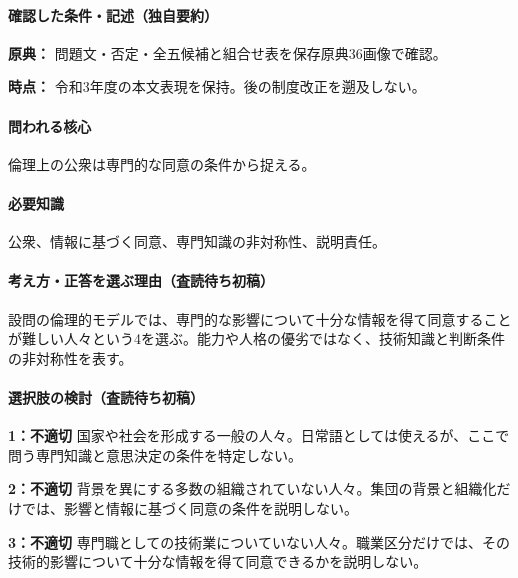 \paragraph{確認した条件・記述（独自要約）}\mbox{}\par

\noindent\textbf{原典：} 問題文・否定・全五候補と組合せ表を保存原典36画像で確認。\par

\noindent\textbf{時点：} 令和3年度の本文表現を保持。後の制度改正を遡及しない。\par

\paragraph{問われる核心} 倫理上の公衆は専門的な同意の条件から捉える。

\paragraph{必要知識} 公衆、情報に基づく同意、専門知識の非対称性、説明責任。

\paragraph{考え方・正答を選ぶ理由（査読待ち初稿）} 設問の倫理的モデルでは、専門的な影響について十分な情報を得て同意することが難しい人々という4を選ぶ。能力や人格の優劣ではなく、技術知識と判断条件の非対称性を表す。

\paragraph{選択肢の検討（査読待ち初稿）}\mbox{}\par

\noindent\textbf{1：不適切} 国家や社会を形成する一般の人々。日常語としては使えるが、ここで問う専門知識と意思決定の条件を特定しない。\par

\noindent\textbf{2：不適切} 背景を異にする多数の組織されていない人々。集団の背景と組織化だけでは、影響と情報に基づく同意の条件を説明しない。\par

\noindent\textbf{3：不適切} 専門職としての技術業についていない人々。職業区分だけでは、その技術的影響について十分な情報を得て同意できるかを説明しない。\par

